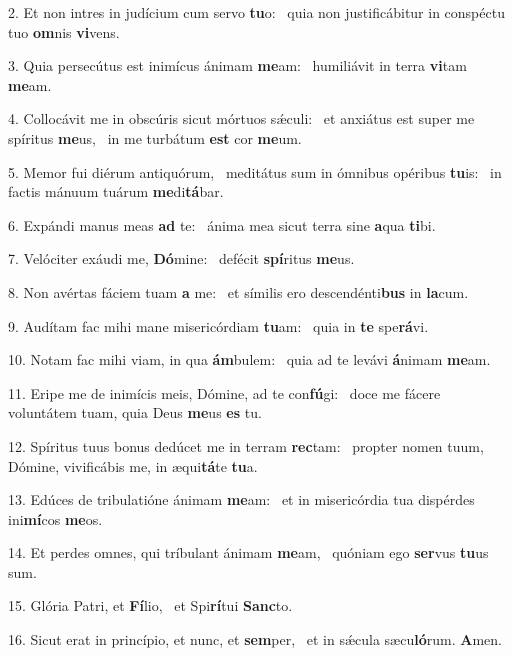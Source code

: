 2. Et non intres in judícium cum servo \textbf{tu}o: \ast\  quia non justificábitur in conspéctu tuo \textbf{om}nis \textbf{vi}vens.\

3. Quia persecútus est inimícus ánimam \textbf{me}am: \ast\  humiliávit in terra \textbf{vi}tam \textbf{me}am.\

4. Collocávit me in obscúris sicut mórtuos sǽculi: \dag\  et anxiátus est super me spíritus \textbf{me}us, \ast\  in me turbátum \textbf{est} cor \textbf{me}um.\

5. Memor fui diérum antiquórum, \dag\  meditátus sum in ómnibus opéribus \textbf{tu}is: \ast\  in factis mánuum tuárum \textbf{me}di\textbf{tá}bar.\

6. Expándi manus meas \textbf{ad} te: \ast\  ánima mea sicut terra sine \textbf{a}qua \textbf{ti}bi.\

7. Velóciter exáudi me, \textbf{Dó}mine: \ast\  defécit \textbf{spí}ritus \textbf{me}us.\

8. Non avértas fáciem tuam \textbf{a} me: \ast\  et símilis ero descendénti\textbf{bus} in \textbf{la}cum.\

9. Audítam fac mihi mane misericórdiam \textbf{tu}am: \ast\  quia in \textbf{te} spe\textbf{rá}vi.\

10. Notam fac mihi viam, in qua \textbf{ám}bulem: \ast\  quia ad te levávi \textbf{á}nimam \textbf{me}am.\

11. Eripe me de inimícis meis, Dómine, ad te con\textbf{fú}gi: \ast\  doce me fácere voluntátem tuam, quia Deus \textbf{me}us \textbf{es} tu.\

12. Spíritus tuus bonus dedúcet me in terram \textbf{rec}tam: \ast\  propter nomen tuum, Dómine, vivificábis me, in æqui\textbf{tá}te \textbf{tu}a.\

13. Edúces de tribulatióne ánimam \textbf{me}am: \ast\  et in misericórdia tua dispérdes ini\textbf{mí}cos \textbf{me}os.\

14. Et perdes omnes, qui tríbulant ánimam \textbf{me}am, \ast\  quóniam ego \textbf{ser}vus \textbf{tu}us sum.\

15. Glória Patri, et \textbf{Fí}lio, \ast\  et Spi\textbf{rí}tui \textbf{Sanc}to.\

16. Sicut erat in princípio, et nunc, et \textbf{sem}per, \ast\  et in sǽcula sæcu\textbf{ló}rum. \textbf{A}men.\

